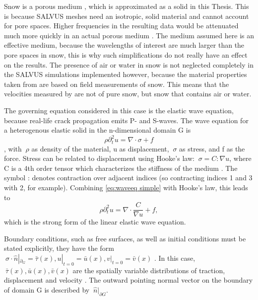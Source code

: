 Snow is a porous medium \parencite{mellorEngineeringPropertiesSnow1977}, which is approximated as a solid in this Thesis. This is because SALVUS meshes need an isotropic, solid material and cannot account for pore spaces. Higher frequencies in the resulting data would be attenuated much more quickly in an actual porous medium \parencite{koushikDevelopmentSeismicSignalbased2024}. The medium assumed here is an effective medium, because the wavelengths of interest are much larger than the pore spaces in snow, this is why such simplifications do not really have an effect on the results. The presence of air or water in snow is not neglected completely in the SALVUS simulations implemented however, because the material properties taken from \cite{guillemotEffectSnowfallChanges2021,trottetTransitionSubRayleighAnticrack2022} are based on field measurements of snow. This means that the velocities measured by \cite{guillemotEffectSnowfallChanges2021} are not of pure snow, but snow that contains air or water. \par

The governing equation considered in this case is the elastic wave equation, because real-life crack propagation emits P- and S-waves. The wave equation for a heterogenous elastic solid in the n-dimensional domain G is 
\begin{equation}
  \rho\partial_t^2u = \nabla \cdot \sigma + f
  \label{eq:waveeq simple}
\end{equation} \parencite{afanasievModularFlexibleSpectralelement2019,kAkiRichards19801981}, with $\ \rho $ as density of the material, u as displacement, $\ \sigma$ as stress, and f as the force. Stress can be related to displacement using Hooke's law: $\ \sigma = C  : \nabla u$, where C is a 4th order tensor which characterizes the stiffness of the medium \parencite{afanasievModularFlexibleSpectralelement2019}. The symbol : denotes contraction over adjacent indices (so contracting indices 1 and 3 with 2, for example). Combining \ref{eq:waveeq simple} with Hooke's law, this leads to \begin{equation}
\rho\partial_t^2u = \nabla \cdot \frac{C}{\nabla u} + f,
\label{eq:strong form}
\end{equation} which is the strong form of the linear elastic wave equation. \par


Boundary conditions, such as free surfaces, as well as initial conditions must be stated explicitly, they have the form $\ \sigma \cdot \hat{n}|_{\partial_G} = \bar{\tau}(x), u|_{t=0} = \bar{u}(x), v|_{t=0} = \bar{v}(x)$ \parencite{afanasievModularFlexibleSpectralelement2019}. In this case, $\ \bar{\tau}(x), \bar{u}(x), \bar{v}(x) $ are the spatially variable distributions of traction, displacement and velocity \parencite{afanasievModularFlexibleSpectralelement2019}. The outward pointing normal vector on the boundary of domain G is described by $\ \hat{n}|_{\partial G}$. \par

